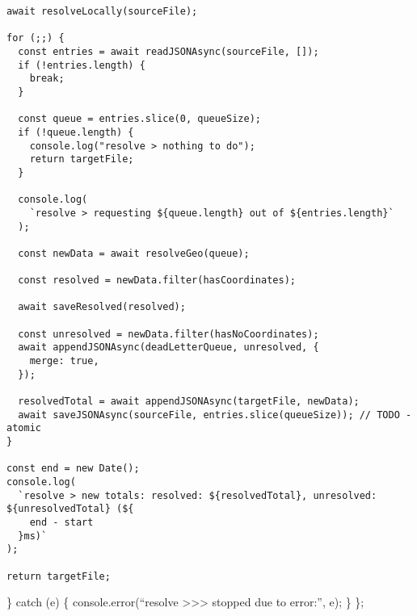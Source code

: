 \documentclass[
]{article}
\begin{document}
\begin{verbatim}
await resolveLocally(sourceFile);

for (;;) {
  const entries = await readJSONAsync(sourceFile, []);
  if (!entries.length) {
    break;
  }

  const queue = entries.slice(0, queueSize);
  if (!queue.length) {
    console.log("resolve > nothing to do");
    return targetFile;
  }

  console.log(
    `resolve > requesting ${queue.length} out of ${entries.length}`
  );

  const newData = await resolveGeo(queue);

  const resolved = newData.filter(hasCoordinates);

  await saveResolved(resolved);

  const unresolved = newData.filter(hasNoCoordinates);
  await appendJSONAsync(deadLetterQueue, unresolved, {
    merge: true,
  });

  resolvedTotal = await appendJSONAsync(targetFile, newData);
  await saveJSONAsync(sourceFile, entries.slice(queueSize)); // TODO - atomic
}

const end = new Date();
console.log(
  `resolve > new totals: resolved: ${resolvedTotal}, unresolved: ${unresolvedTotal} (${
    end - start
  }ms)`
);

return targetFile;
\end{verbatim}

\} catch (e) \{ console.error(``resolve
\textgreater\textgreater\textgreater{} stopped due to error:'', e); \}
\};
\end{document}
